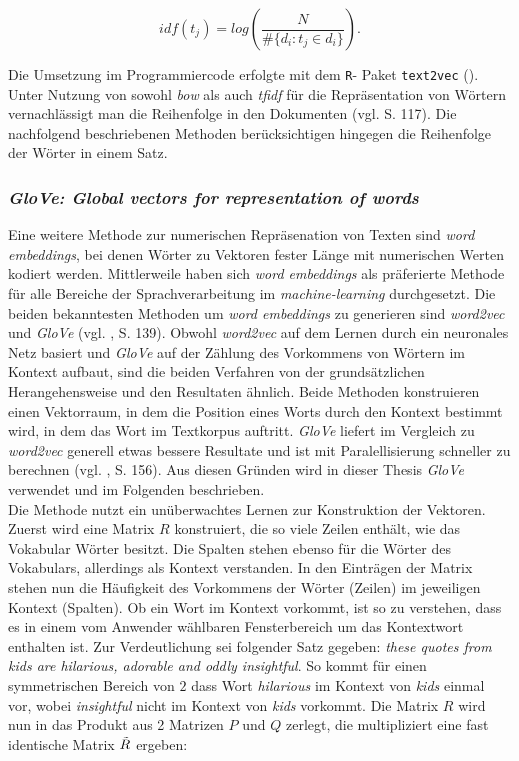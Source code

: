 \documentclass[a4paper,11pt]{article}
\begin{document}
\[idf(t_j) = log(\frac{N}{\# \{d_i: t_j \in d_i \}}) .\]

Die Umsetzung im Programmiercode erfolgte mit dem \texttt{R}- Paket \texttt{text2vec} (\cite{text2vec}).\\

Unter Nutzung von sowohl \textit{bow} als auch \textit{tfidf} für die Repräsentation von Wörtern vernachlässigt man die Reihenfolge in den Dokumenten (vgl. \cite{deepEssentials} S. 117). Die nachfolgend beschriebenen Methoden berücksichtigen hingegen die Reihenfolge der Wörter in einem Satz.


\subsubsection{\textit{GloVe: Global vectors for representation of words}} \label{Kap:Glove}

Eine weitere Methode zur numerischen Repräsenation von Texten sind \textit{word embeddings}, bei denen Wörter zu Vektoren fester Länge mit numerischen Werten kodiert werden. Mittlerweile haben sich \textit{word embeddings} als präferierte Methode für alle Bereiche der Sprachverarbeitung im \textit{machine-learning} durchgesetzt. Die beiden bekanntesten Methoden um \textit{word embeddings} zu generieren sind \textit{word2vec} und \textit{GloVe} (vgl. \cite{keras}, S. 139). Obwohl \textit{word2vec} auf dem Lernen durch ein neuronales Netz basiert und \textit{GloVe} auf der Zählung des Vorkommens von Wörtern im Kontext aufbaut, sind die beiden Verfahren von der grundsätzlichen Herangehensweise und den Resultaten ähnlich. Beide Methoden konstruieren einen Vektorraum, in dem die Position eines Worts durch den Kontext bestimmt wird, in dem das Wort im Textkorpus auftritt.
\textit{GloVe} liefert im Vergleich zu \textit{word2vec} generell etwas bessere Resultate und ist mit Paralellisierung schneller zu berechnen (vgl. \cite{keras}, S. 156). Aus diesen Gründen wird in dieser Thesis \textit{GloVe} verwendet und im Folgenden beschrieben. \\
Die Methode nutzt ein unüberwachtes Lernen zur Konstruktion der Vektoren. Zuerst wird eine Matrix $R$ konstruiert, die so viele Zeilen enthält, wie das Vokabular Wörter besitzt. Die Spalten stehen ebenso für die Wörter des Vokabulars, allerdings als Kontext verstanden. In den Einträgen der Matrix stehen nun die Häufigkeit des Vorkommens der Wörter (Zeilen) im jeweiligen Kontext (Spalten). Ob ein Wort im Kontext vorkommt, ist so zu verstehen, dass es in einem vom Anwender wählbaren Fensterbereich um das Kontextwort enthalten ist. Zur Verdeutlichung sei folgender Satz gegeben: \textit{these quotes from kids are hilarious, adorable and oddly insightful}. So kommt für einen symmetrischen Bereich von $2$ dass Wort \textit{hilarious} im Kontext von \textit{kids} einmal vor, wobei \textit{insightful} nicht im Kontext von \textit{kids} vorkommt. 
Die Matrix $R$ wird nun in das Produkt aus 2 Matrizen $P$ und $Q$ zerlegt, die multipliziert eine fast identische Matrix $\Tilde{R}$ ergeben:
\end{document}
